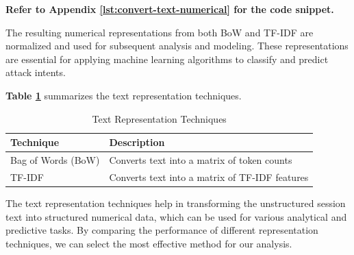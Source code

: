         \textbf{Refer to Appendix \ref{lst:convert-text-numerical} for the code snippet.}

        The resulting numerical representations from both BoW and TF-IDF are normalized and used for subsequent analysis and modeling. These representations are essential for applying machine learning algorithms to classify and predict attack intents.

        \textbf{Table \ref{tab:text-representation}} summarizes the text representation techniques.

        \begin{table}[h]
            \centering
            \caption{Text Representation Techniques}
            \label{tab:text-representation}
            \begin{tabular}{|l|l|}
                \hline
                \textbf{Technique} & \textbf{Description} \\ \hline
                Bag of Words (BoW) & Converts text into a matrix of token counts \\ \hline
                TF-IDF & Converts text into a matrix of TF-IDF features \\ \hline
            \end{tabular}
        \end{table}

        The text representation techniques help in transforming the unstructured session text into structured numerical data, which can be used for various analytical and predictive tasks. By comparing the performance of different representation techniques, we can select the most effective method for our analysis.
